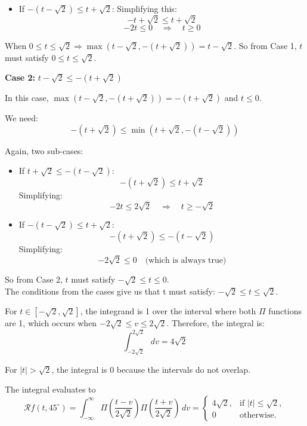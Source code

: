 \documentclass[12pt,twoside]{article}
\begin{document}
\begin{enumerate}
\begin{itemize}
    \item If \( -(t - \sqrt{2}) \leq t + \sqrt{2} \):
    Simplifying this:
    \[
    - t + \sqrt{2} \leq t + \sqrt{2}
    \]
    \[
    -2t \leq 0 \quad \Rightarrow \quad t \geq 0
    \]
\end{itemize}

When  \( 0 \leq t \leq \sqrt{2} \Rightarrow \)\( \max(t - \sqrt{2}, -(t + \sqrt{2})) = t - \sqrt{2} \).
So from Case 1, \( t \) must satisfy \( 0 \leq t \leq \sqrt{2} \).

\textbf{Case 2: } \( t - \sqrt{2} \leq -(t + \sqrt{2}) \)

In this case, \( \max(t - \sqrt{2}, -(t + \sqrt{2})) = -(t + \sqrt{2}) \) and \( t \leq 0 \).

We need:
\[
-(t + \sqrt{2}) \leq \min(t + \sqrt{2}, -(t - \sqrt{2}))
\]


Again, two sub-cases:

\begin{itemize}
    \item If \( t + \sqrt{2} \leq -(t - \sqrt{2}) \):
    \[
    -(t + \sqrt{2}) \leq t + \sqrt{2}
    \]
    Simplifying:
    \[
    -2t \leq 2\sqrt{2} \quad \Rightarrow \quad t \geq -\sqrt{2}
    \]

    \item If \( -(t - \sqrt{2}) \leq t + \sqrt{2} \):
    \[
    -(t + \sqrt{2}) \leq -(t - \sqrt{2})
    \]
    Simplifying:
    \[
    -2\sqrt{2} \leq 0 \quad \text{(which is always true)}
    \]
\end{itemize}

So from Case 2, \( t \) must satisfy \( -\sqrt{2}  \leq t \leq 0\).
\[\]
The conditions from the cases give us that t must satisfy: $- \sqrt{2}  \leq  t  \leq  \sqrt{2} $.

For $t \in \left[ - \sqrt{2},  \sqrt{2} \right]$, the integrand is 1 over the interval where both $\Pi$ functions are 1, which occurs when 
$ -2 \sqrt{2}  \leq  v  \leq  2 \sqrt{2}$. Therefore, the integral is:
\[
	 \int_{-2 \sqrt{2}}^{2 \sqrt{2}} dv  = 4 \sqrt{2}
\]

For $|t| > \sqrt{2}$, the integral is 0  because the intervals do not overlap.

The integral evaluates to
\[
\mathcal{R}f(t, 45^{\circ})  =
 \int_{-\infty}^{\infty} \Pi\left(\frac{t-v}{2\sqrt{2}}\right) \Pi\left(\frac{t+v}{2\sqrt{2}}\right) \, dv  =
\begin{cases}
     4 \sqrt{2}, & \text{if } |t| \leq \sqrt{2}, \\
    0 & \text{otherwise}.
\end{cases}
\]


\end{enumerate}
\end{document}
